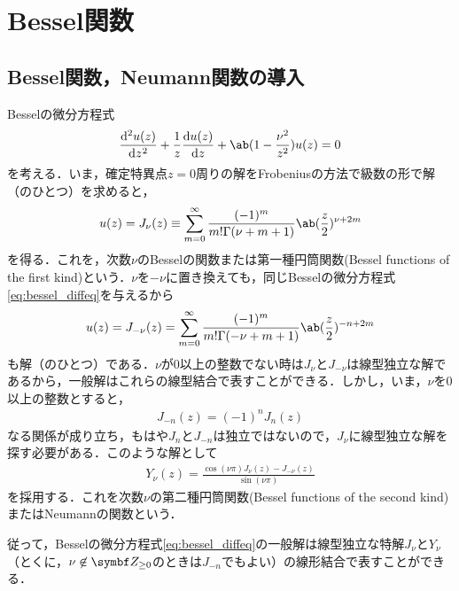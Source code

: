 \section{Bessel関数}
\subsection{Bessel関数，Neumann関数の導入}
Besselの微分方程式
\begin{gather}
  \label{eq:bessel_diffeq}
  \diff[2]{u(z)}{z} + \frac{1}{z} \diff{u(z)}{z} + \ab(1 - \frac{\nu^2}{z^2}) u(z) = 0
\end{gather}
を考える．いま，確定特異点$z = 0$周りの解をFrobeniusの方法で級数の形で解（のひとつ）を求めると，
\begin{gather}
  u(z) = J_\nu(z) \equiv \sum_{m=0}^{\infty} \frac{(-1)^m}{m! \Gamma(\nu+m+1)} \ab(\frac{z}{2})^{\nu+2m}
\end{gather}
を得る．これを，次数$\nu$のBesselの関数または第一種円筒関数(Bessel functions of the first kind)という．$\nu$を$-\nu$に置き換えても，同じBesselの微分方程式\eqref{eq:bessel_diffeq}を与えるから
\begin{gather}
  u(z) = J_{-\nu}(z) = \sum_{m=0}^{\infty} \frac{(-1)^m}{m! \Gamma(-\nu+m+1)} \ab(\frac{z}{2})^{-n+2m}
\end{gather}
も解（のひとつ）である．$\nu$が0以上の整数でない時は$J_\nu$と$J_{-\nu}$は線型独立な解であるから，一般解はこれらの線型結合で表すことができる．しかし，いま，$\nu$を0以上の整数とすると，
\begin{gather}
  J_{-n}(z) = (-1)^n J_n(z)
\end{gather}
なる関係が成り立ち，もはや$J_n$と$J_{-n}$は独立ではないので，$J_\nu$に線型独立な解を探す必要がある．このような解として
\begin{gather}
Y_\nu(z) = \frac{\cos(\nu \pi) J_\nu(z) - J_{-\nu}(z)}{\sin(\nu \pi)}
\end{gather}
を採用する．これを次数$\nu$の第二種円筒関数(Bessel functions of the second kind)またはNeumannの関数という．

従って，Besselの微分方程式\eqref{eq:bessel_diffeq}の一般解は線型独立な特解$J_\nu$と$Y_\nu$（とくに，$\nu \not \in \mb{Z}_{\geq 0}$のときは$J_{-n}$でもよい）の線形結合で表すことができる．

